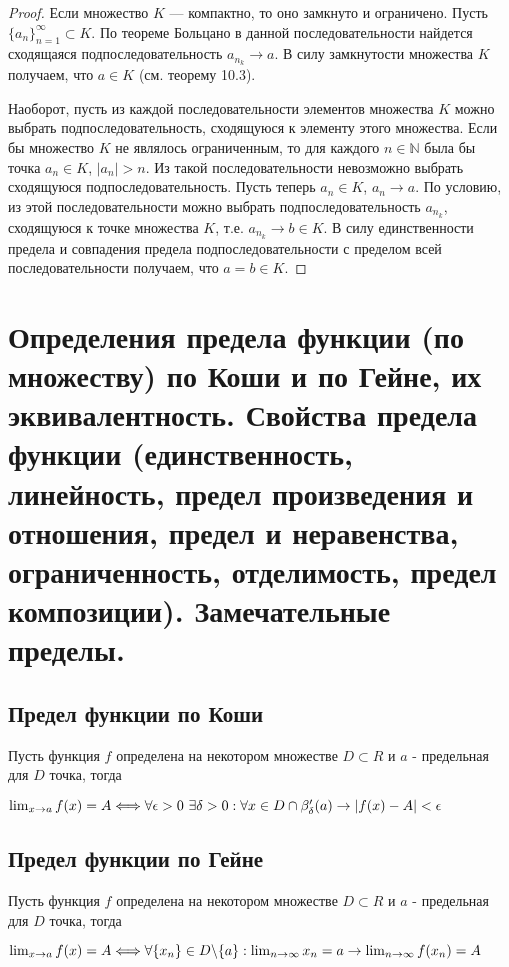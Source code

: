 \documentclass[12pt]{article}
\theoremstyle{definition}
\begin{document}
\begin{proof}
Если множество $K$ --- компактно, то оно замкнуто и ограничено.
Пусть $\{a_n\}_{n=1}^\infty\subset K$. По теореме Больцано в данной последовательности
найдется сходящаяся подпоследовательность $a_{n_k}\to a$. В силу замкнутости множества $K$
получаем, что $a\in K$ (см. теорему 10.3).

Наоборот, пусть из каждой последовательности элементов множества $K$
можно выбрать подпоследовательность, сходящуюся к элементу этого множества.
Если бы множество $K$ не являлось ограниченным, то для каждого $n\in \mathbb{N}$
была бы точка $a_n\in K$, $|a_n|>n$. Из такой последовательности невозможно выбрать
сходящуюся подпоследовательность. Пусть теперь $a_n\in K$, $a_n\to a$.
По условию, из этой последовательности можно выбрать подпоследовательность $a_{n_k}$,
сходящуюся к точке множества $K$, т.е. $a_{n_k}\to b\in K$. В силу единственности предела
и совпадения предела подпоследовательности с пределом всей последовательности получаем,
что $a=b\in K$.
\end{proof}

\section{Определения предела функции (по множеству) по Коши и по Гейне, их эквивалентность. Свойства предела функции (единственность, линейность, предел произведения и отношения, предел и неравенства, ограниченность, отделимость, предел композиции). Замечательные пределы.}
\subsection{Предел функции по Коши}
Пусть функция $f$ определена на некотором множестве $D \subset R$ и $a $ - предельная для $D$ точка, тогда
\begin{center}
$\lim_{x \to a} f(x) = A \Longleftrightarrow \\ \forall \epsilon > 0 \ \exists \delta > 0: \forall x \in D \cap \beta'_{\delta}(a) \to |f(x) - A | < \epsilon$
\end{center}
\subsection{Предел функции по Гейне}
Пусть функция $f$ определена на некотором множестве $D \subset R$ и $a $ - предельная для $D$ точка, тогда
\begin{center}
$\lim_{x \to a} f(x) = A \Longleftrightarrow \\ \forall \{x_n\} \in D \backslash \{a\} :\lim_{n \to \infty}x_n = a \to \lim_{n\to \infty} f(x_n) = A$
\end{center}
\end{document}
